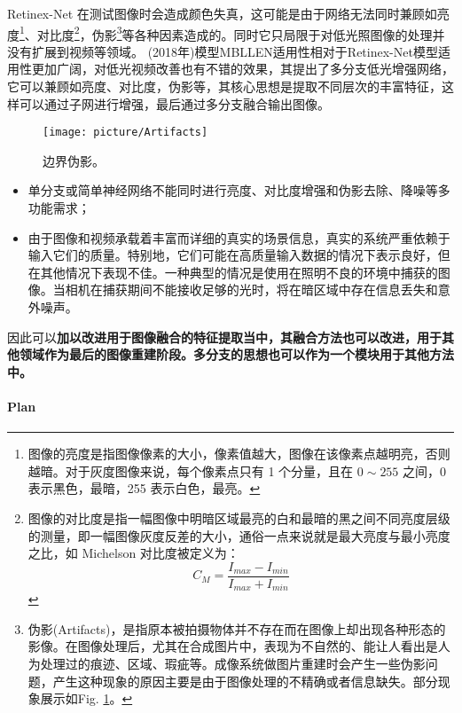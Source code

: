 \documentclass[letterpaper,10pt]{article}
\begin{document}
		Retinex-Net 在测试图像时会造成颜色失真，这可能是由于网络无法同时兼顾如亮度\footnote{图像的亮度是指图像像素的大小，像素值越大，图像在该像素点越明亮，否则越暗。对于灰度图像来说，每个像素点只有 1 个分量，且在 $0 \sim 255$ 之间，0 表示黑色，最暗，255 表示白色，最亮。}、对比度\footnote{图像的对比度是指一幅图像中明暗区域最亮的白和最暗的黑之间不同亮度层级的测量，即一幅图像灰度反差的大小，通俗一点来说就是最大亮度与最小亮度之比，如 Michelson 对比度被定义为：$$C_M = \frac{I_{max} - I_{min}}{I_{max} + I_{min}}$$}，伪影\footnote{伪影(Artifacts)，是指原本被拍摄物体并不存在而在图像上却出现各种形态的影像。在图像处理后，尤其在合成图片中，表现为不自然的、能让人看出是人为处理过的痕迹、区域、瑕疵等。成像系统做图片重建时会产生一些伪影问题，产生这种现象的原因主要是由于图像处理的不精确或者信息缺失。部分现象展示如Fig. \ref{fig: Ringing Artifacts}。
		
		}等各种因素造成的。同时它只局限于对低光照图像的处理并没有扩展到视频等领域。
		(2018年)模型MBLLEN\cite{Lv2018MBLLEN}适用性相对于Retinex-Net模型适用性更加广阔，对低光视频改善也有不错的效果，其提出了多分支低光增强网络，它可以兼顾如亮度、对比度，伪影等，其核心思想是提取不同层次的丰富特征，这样可以通过子网进行增强，最后通过多分支融合输出图像。
		
		\begin{figure}[htbp]
			\centering 
			\texttt{[image: picture/Artifacts]}
			\caption{
				\label{fig: Ringing Artifacts} 
				边界伪影。
			}
		\end{figure}
		
		\begin{itemize}
			\item{}
			单分支或简单神经网络不能同时进行亮度、对比度增强和伪影去除、降噪等多功能需求；
			\item{}
			由于图像和视频承载着丰富而详细的真实的场景信息，真实的系统严重依赖于输入它们的质量。特别地，它们可能在高质量输入数据的情况下表示良好，但在其他情况下表现不佳。一种典型的情况是使用在照明不良的环境中捕获的图像。当相机在捕获期间不能接收足够的光时，将在暗区域中存在信息丢失和意外噪声。
		\end{itemize}
	
		因此可以\textbf {\color{red}{仔细研究其特征提取模块(FEM)}加以改进用于图像融合的特征提取当中，其融合方法也可以改进，用于其他领域作为最后的图像重建阶段。多分支的思想也可以作为一个模块用于其他方法中。}
		
		\paragraph{Plan}
		
\end{document}

